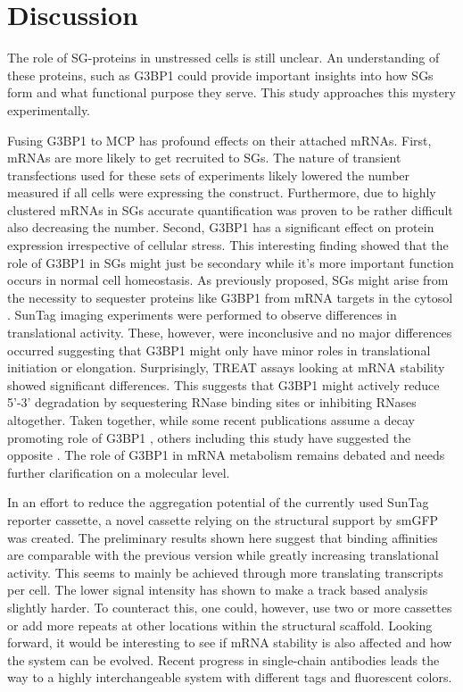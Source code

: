 \chapter{Discussion}


The role of SG-proteins in unstressed cells is still unclear.
An understanding of these proteins, such as G3BP1 could provide important insights into how SGs form and what functional purpose they serve.
This study approaches this mystery experimentally.

Fusing G3BP1 to MCP has profound effects on their attached mRNAs.
First, mRNAs are more likely to get recruited to SGs.
The nature of transient transfections used for these sets of experiments likely lowered the number measured if all cells were expressing the construct.
Furthermore, due to highly clustered mRNAs in SGs accurate quantification was proven to be rather difficult also decreasing the number.
Second, G3BP1 has a significant effect on protein expression irrespective of cellular stress.
This interesting finding showed that the role of G3BP1 in SGs might just be secondary while it's more important function occurs in normal cell homeostasis.
As previously proposed, SGs might arise from the necessity to sequester proteins like G3BP1 from mRNA targets in the cytosol \cite{fischer_structure-mediated_2020}.
SunTag imaging experiments were performed to observe differences in translational activity.
These, however, were inconclusive and no major differences occurred suggesting that G3BP1 might only have minor roles in translational initiation or elongation.
Surprisingly, TREAT assays looking at mRNA stability showed significant differences.
This suggests that G3BP1 might actively reduce 5'-3' degradation by sequestering RNase binding sites or inhibiting RNases altogether.
Taken together, while some recent publications assume a decay promoting role of G3BP1 \cite{fischer_structure-mediated_2020, tourriere_rasgap-associated_2001}, others including this study have suggested the opposite \cite{aulas_g3bp1_2015, bley_stress_2015, laver_rna-binding_2020}.
The role of G3BP1 in mRNA metabolism remains debated and needs further clarification on a molecular level.

In an effort to reduce the aggregation potential of the currently used SunTag reporter cassette, a novel cassette relying on the structural support by smGFP was created.
The preliminary results shown here suggest that binding affinities are comparable with the previous version while greatly increasing translational activity.
This seems to mainly be achieved through more translating transcripts per cell.
The lower signal intensity has shown to make a track based analysis slightly harder.
To counteract this, one could, however, use two or more cassettes or add more repeats at other locations within the structural scaffold.
Looking forward, it would be interesting to see if mRNA stability is also affected and how the system can be evolved.
Recent progress in single-chain antibodies leads the way to a highly interchangeable system with different tags and fluorescent colors.
